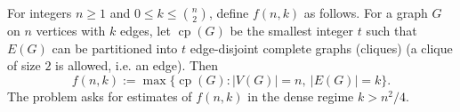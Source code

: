 For integers $n\ge 1$ and $0\le k\le \binom{n}{2}$, define $f(n,k)$ as follows.
For a graph $G$ on $n$ vertices with $k$ edges, let $\operatorname{cp}(G)$ be the smallest integer $t$ such that $E(G)$ can be partitioned into $t$ edge-disjoint complete graphs (cliques) (a clique of size $2$ is allowed, i.e. an edge).
Then
\[
f(n,k):=\max\{\operatorname{cp}(G): |V(G)|=n,\ |E(G)|=k\}.
\]
The problem asks for estimates of $f(n,k)$ in the dense regime $k>n^2/4$.
